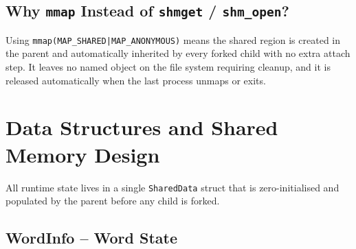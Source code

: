 \documentclass[12pt,a4paper]{article}
\newcommand{\code}[1]{\texttt{\small #1}}
\begin{document}
\subsection{Why \texttt{mmap} Instead of \texttt{shmget} / \texttt{shm\_open}?}

Using \code{mmap(MAP\_SHARED|MAP\_ANONYMOUS)} means the shared region is created
in the parent and automatically inherited by every forked child with no extra
attach step. It leaves no named object on the file system requiring cleanup, and
it is released automatically when the last process unmaps or exits.

\section{Data Structures and Shared Memory Design}

All runtime state lives in a single \code{SharedData} struct that is
zero-initialised and populated by the parent before any child is forked.

\subsection{WordInfo -- Word State}
\end{document}
